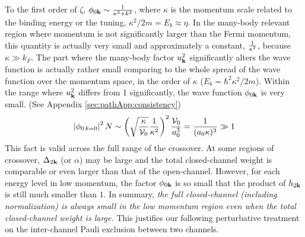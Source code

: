 To  the first order of $\zeta$, $\phi_{0\mathbf{k}}\sim\frac{1}{\kappa^{2}+k^{2}}$, where $\kappa$ is the momentum scale related to the binding energy or the tuning, $\kappa^{2}/2m=E_{b}\approx\eta$.     In the many-body relevant region where momentum is not significantly larger than the Fermi momentum, this quantity is actually very small and approximately a constant, $\frac{1}{\kappa^{2}}$, because $\kappa{}\gg{}k_{F}$.  The part where the many-body factor $u_{\mathbf{k}}^{2}$ significantly alters the wave function is actually rather small comparing to the whole spread of the wave function over the momentum space, in the order of $\kappa$ ($E_{b}=\hbar^{2}\kappa^{2}/2m$).  Within the range where $u_{\mathbf{k}}^{2}$ differs from 1 significantly, the wave function $\phi_{0\mathbf{k}}$ is very small.  (See Appendix \ref{sec:pathApp:consistency})
\begin{equation*}
\left\lvert{\phi_{0\,k=0}}\right\rvert^{2}N\sim\left(\sqrt{\frac{\kappa}{\mathcal{V}_{0}}}\frac{1}{\kappa^{2}}\right)^{2}\frac{\mathcal{V}_{0}}{a_{0}^{3}}=\frac{1}{(a_{0}\kappa)^{3}}\gg1
\end{equation*}
 This fact is valid across the full range of the crossover.  At some regions of crossover, $\Delta_{2\mathbf{k}}$ (or $\alpha$) may be large and the total closed-channel weight is comparable or even larger than that of the open-channel. However, for each energy level in low  momentum, the factor $\phi_{0\mathbf{k}}$ is so small that the product of $h_{2\mathbf{k}}$ is still much smaller than $1$.  
In summary, \emph{the full closed-channel (including normalization) is always small in the low momentum region  even when the total closed-channel weight is large.}  This justifies our following perturbative treatment on the inter-channel Pauli exclusion between two channels. 


